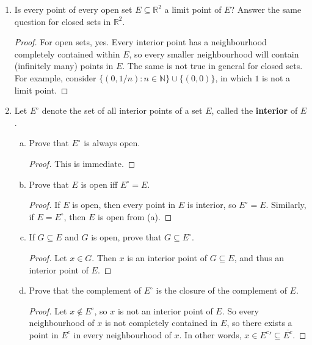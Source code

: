 \documentclass{scrbook}
\newcommand{\N}{\mathbb{N}}
\newcommand{\Q}{\mathbb{Q}}
\newcommand{\R}{\mathbb{R}}
\begin{document}
\begin{enumerate}
\begin{enumerate}[(a)]
\begin{proof}
The inclusion can be proper: let $A_n$ be the set of rationals such that $q = m/n$ in lowest form. Then, $B = \Q$, whose closure is $\R$, whereas the right side is still $\Q$, as $\overline{A_i} = A_i$ for all $i$.
\end{proof}
\end{enumerate}

\item %
Is every point of every open set $E \subseteq \R^2$ a limit point of $E$? Answer the same question for closed sets in $\R^2$.

\begin{proof}
For open sets, yes. Every interior point has a neighbourhood completely contained within $E$, so every smaller neighbourhood will contain (infinitely many) points in $E$. The same is not true in general for closed sets. For example, consider $\{(0, 1/n): n \in \N\} \cup \{(0, 0)\}$, in which $1$ is not a limit point. 
\end{proof}

\item %
Let $E^\circ$ denote the set of all interior points of a set $E$, called the \textbf{interior} of $E$.
\begin{enumerate}[(a)]
\item Prove that $E^\circ$ is always open.
\begin{proof}
This is immediate.
\end{proof}

\item Prove that $E$ is open iff $E^\circ = E$.
\begin{proof}
If $E$ is open, then every point in $E$ is interior, so $E^\circ = E$. Similarly, if $E = E^\circ$, then $E$ is open from (a).
\end{proof}

\item If $G \subseteq E$ and $G$ is open, prove that $G \subseteq E^\circ$. 
\begin{proof}
Let $x \in G$. Then $x$ is an interior point of $G \subseteq E$, and thus an interior point of $E$.
\end{proof}

\item Prove that the complement of $E^\circ$ is the closure of the complement of $E$.
\begin{proof}
Let $x \not\in E^\circ$, so $x$ is not an interior point of $E$. So every neighbourhood of $x$ is not completely contained in $E$, so there exists a point in $E^c$ in every neighbourhood of $x$. In other words, $x \in {E^c}' \subseteq \overline{E^c}$. 


\end{proof}
\end{enumerate}
\end{enumerate}
\end{document}
